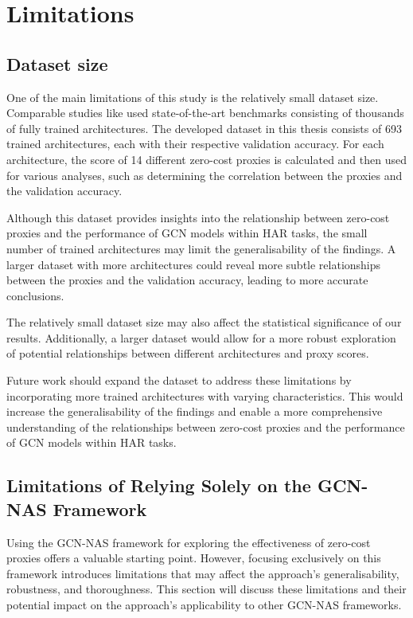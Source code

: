 \section{Limitations}
\subsection{Dataset size}

One of the main limitations of this study is the relatively small dataset size. Comparable studies like \autocite{abdelfattah2021zero, colin2022adeeperlook} used state-of-the-art benchmarks consisting of thousands of fully trained architectures. The developed dataset in this thesis consists of 693 trained architectures, each with their respective validation accuracy. For each architecture, the score of 14 different zero-cost proxies is calculated and then used for various analyses, such as determining the correlation between the proxies and the validation accuracy.

Although this dataset provides insights into the relationship between zero-cost proxies and the performance of \gls{GCN} models within \gls{HAR} tasks, the small number of trained architectures may limit the generalisability of the findings. A larger dataset with more architectures could reveal more subtle relationships between the proxies and the validation accuracy, leading to more accurate conclusions.

The relatively small dataset size may also affect the statistical significance of our results. Additionally, a larger dataset would allow for a more robust exploration of potential relationships between different architectures and proxy scores.

Future work should expand the dataset to address these limitations by incorporating more trained architectures with varying characteristics. This would increase the generalisability of the findings and enable a more comprehensive understanding of the relationships between zero-cost proxies and the performance of \gls{GCN} models within \gls{HAR} tasks.


\subsection{Limitations of Relying Solely on the GCN-NAS Framework}

Using the \gls{GCN}-\gls{NAS} framework for exploring the effectiveness of zero-cost proxies offers a valuable starting point. However, focusing exclusively on this framework introduces limitations that may affect the approach's generalisability, robustness, and thoroughness. This section will discuss these limitations and their potential impact on the approach's applicability to other \gls{GCN}-\gls{NAS} frameworks.


